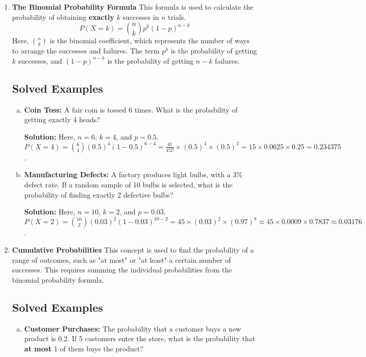 \documentclass{article}
\begin{document}
\begin{enumerate}
    \item \textbf{The Binomial Probability Formula}
    This formula is used to calculate the probability of obtaining \textbf{exactly} $k$ successes in $n$ trials.
    $$ P(X=k) = \binom{n}{k} p^k (1-p)^{n-k} $$
    Here, $\binom{n}{k}$ is the binomial coefficient, which represents the number of ways to arrange the successes and failures. The term $p^k$ is the probability of getting $k$ successes, and $(1-p)^{n-k}$ is the probability of getting $n-k$ failures.

    \subsection*{Solved Examples}
    \begin{enumerate}[a)]
        \item \textbf{Coin Toss:} A fair coin is tossed 6 times. What is the probability of getting exactly 4 heads?
        
        \textbf{Solution:} Here, $n=6$, $k=4$, and $p=0.5$.
        $P(X=4) = \binom{6}{4} (0.5)^4 (1-0.5)^{6-4} = \frac{6!}{4!2!} \times (0.5)^4 \times (0.5)^2 = 15 \times 0.0625 \times 0.25 = 0.234375$.
        
        \item \textbf{Manufacturing Defects:} A factory produces light bulbs, with a 3\% defect rate. If a random sample of 10 bulbs is selected, what is the probability of finding exactly 2 defective bulbs?
        
        \textbf{Solution:} Here, $n=10$, $k=2$, and $p=0.03$.
        $P(X=2) = \binom{10}{2} (0.03)^2 (1-0.03)^{10-2} = 45 \times (0.03)^2 \times (0.97)^8 \approx 45 \times 0.0009 \times 0.7837 \approx 0.03176$.
    \end{enumerate}

    \item \textbf{Cumulative Probabilities}
    This concept is used to find the probability of a range of outcomes, such as "at most" or "at least" a certain number of successes. This requires summing the individual probabilities from the binomial probability formula.

    \subsection*{Solved Examples}
    \begin{enumerate}[a)]
        \item \textbf{Customer Purchases:} The probability that a customer buys a new product is 0.2. If 5 customers enter the store, what is the probability that \textbf{at most} 1 of them buys the product?
        

\end{enumerate}
\end{enumerate}
\end{document}
